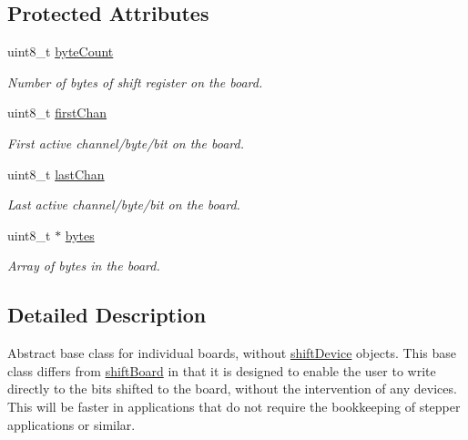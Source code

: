 \subsection*{Protected Attributes}
\begin{DoxyCompactItemize}
\item 
uint8\_\-t \hyperlink{classshift_board_direct_abc23adad3ba60c3e26e69945aaa98012}{byteCount}
\begin{DoxyCompactList}\small\item\em Number of bytes of shift register on the board. \item\end{DoxyCompactList}\item 
uint8\_\-t \hyperlink{classshift_board_direct_a16ef946d7cef5a67b726eeba6f4b020a}{firstChan}
\begin{DoxyCompactList}\small\item\em First active channel/byte/bit on the board. \item\end{DoxyCompactList}\item 
uint8\_\-t \hyperlink{classshift_board_direct_a99e0f303fee22d079b677b253369c440}{lastChan}
\begin{DoxyCompactList}\small\item\em Last active channel/byte/bit on the board. \item\end{DoxyCompactList}\item 
uint8\_\-t $\ast$ \hyperlink{classshift_board_direct_ab71f1de9ff5b1324445099f001ce7231}{bytes}
\begin{DoxyCompactList}\small\item\em Array of bytes in the board. \item\end{DoxyCompactList}\end{DoxyCompactItemize}


\subsection{Detailed Description}
Abstract base class for individual boards, without \hyperlink{classshift_device}{shiftDevice} objects. This base class differs from \hyperlink{classshift_board}{shiftBoard} in that it is designed to enable the user to write directly to the bits shifted to the board, without the intervention of any devices. This will be faster in applications that do not require the bookkeeping of stepper applications or similar. 

